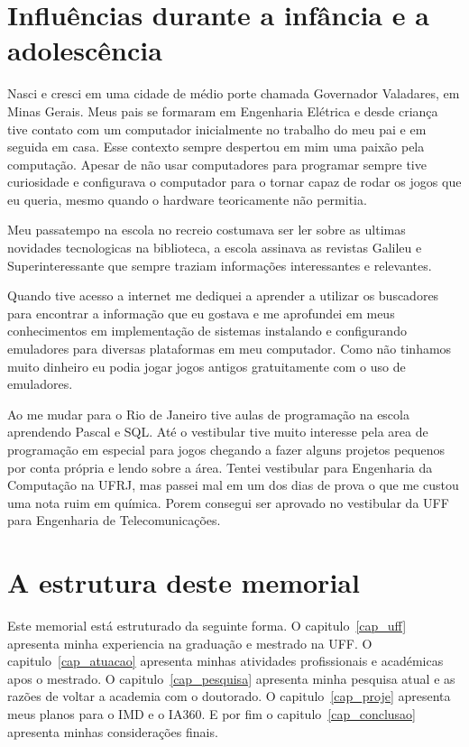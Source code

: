 \documentclass[10pt,a4paper,oneside]{book}
\begin{document}
\section{Influências durante a infância e a adolescência}
Nasci e cresci em uma cidade de médio porte chamada Governador Valadares, em Minas Gerais. 
Meus pais se formaram em Engenharia Elétrica e desde criança tive contato com um computador 
inicialmente no trabalho do meu pai e em seguida em casa. Esse contexto sempre despertou em mim
uma paixão pela computação. Apesar de não usar computadores para programar sempre
tive curiosidade e configurava o computador para o tornar capaz de rodar os jogos que eu queria, mesmo quando o
hardware teoricamente não permitia.

Meu passatempo na escola no recreio costumava ser ler sobre as ultimas novidades
tecnologicas na biblioteca, a escola assinava as  revistas Galileu e Superinteressante que sempre traziam informações
interessantes e relevantes.

Quando tive acesso a internet me dediquei a aprender a utilizar os buscadores para encontrar 
a informação que eu gostava e me aprofundei em meus conhecimentos em implementação de sistemas
instalando e configurando emuladores para diversas plataformas em meu computador. Como não tinhamos
muito dinheiro eu podia jogar jogos antigos gratuitamente com o uso de emuladores.

Ao me mudar para o Rio de Janeiro tive aulas de programação na escola aprendendo Pascal e SQL. 
Até o vestibular tive muito interesse pela area de programação em especial para jogos chegando a 
fazer alguns projetos pequenos por conta própria e lendo sobre a área. Tentei vestibular para Engenharia da Computação
na UFRJ, mas passei mal em um dos dias de prova o que me custou uma nota ruim em química. Porem consegui ser aprovado
no vestibular da UFF para Engenharia de Telecomunicações.


\section{A estrutura deste memorial}

Este memorial está estruturado da seguinte forma. O capitulo~\ref{cap_uff} apresenta minha 
experiencia na graduação e mestrado na UFF. O capitulo~\ref{cap_atuacao} apresenta minhas atividades 
profissionais e académicas apos o mestrado. O capitulo~\ref{cap_pesquisa} apresenta minha pesquisa
atual e as razões de voltar a academia com o doutorado. O capitulo~\ref{cap_proje} apresenta
meus planos para o IMD e o IA360. E por fim o capitulo~\ref{cap_conclusao} apresenta minhas 
considerações finais.
\end{document}
